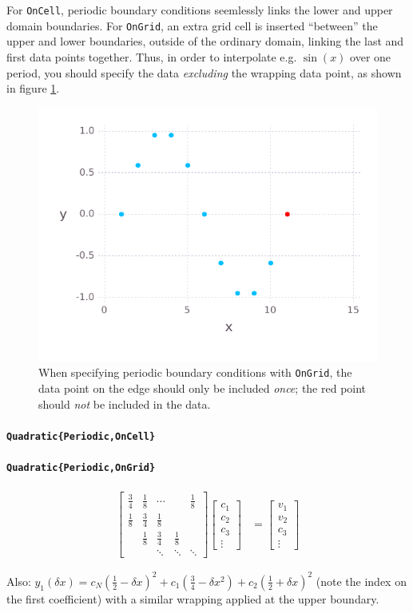 \documentclass{article}
\begin{document}
For \texttt{OnCell}, periodic boundary conditions seemlessly links the lower and upper domain boundaries. For \texttt{OnGrid}, an extra grid cell is inserted ``between'' the upper and lower boundaries, outside of the ordinary domain, linking the last and first data points together. Thus, in order to interpolate e.g. $\sin(x)$ over one period, you should specify the data \emph{excluding} the wrapping data point, as shown in figure \ref{fig:periodic-data-spec}.
\begin{figure}
\centering
\includegraphics{figures/periodic-data}
\caption{When specifying periodic boundary conditions with \texttt{OnGrid}, the data point on the edge should only be included \emph{once}; the red point should \emph{not} be included in the data.}
\label{fig:periodic-data-spec}
\end{figure}

\paragraph{\texttt{Quadratic\{Periodic,OnCell\}}}
\paragraph{\texttt{Quadratic\{Periodic,OnGrid\}}}
\begin{align*}
\begin{bmatrix}
\frac{3}{4} & \frac{1}{8} & \cdots & & \frac{1}{8}\\
\frac{1}{8} & \frac{3}{4} & \frac{1}{8} \\
 & \frac{1}{8} & \frac{3}{4} & \frac{1}{8} \\
 & & \ddots & \ddots & \ddots
\end{bmatrix}
\begin{bmatrix}c_1\\ c_2\\ c_3\\\vdots\end{bmatrix}
&=
\begin{bmatrix}v_1 \\ v_2 \\ c_3\\\vdots\end{bmatrix}
\end{align*}

Also: $y_1(\delta x) = c_N (\frac{1}{2} - \delta x)^2 + c_1 (\frac{3}{4} - \delta x^2) + c_2(\frac{1}{2} + \delta x)^2$ (note the index on the first coefficient) with a similar wrapping applied at the upper boundary.

\nocite{*}
\printbibliography
\end{document}
